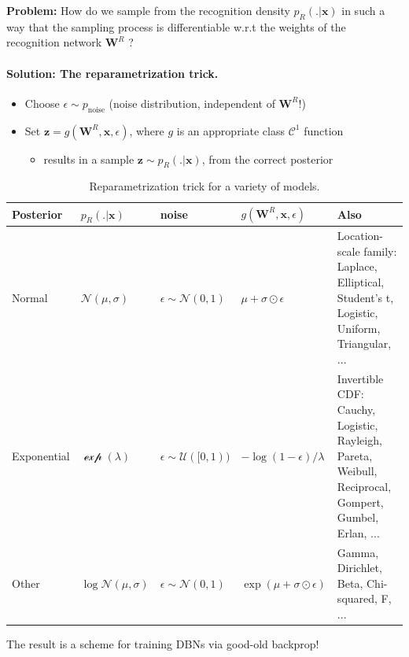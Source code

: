 \documentclass{article} %
\def\z{\mathbf{z}}
\def\W{\mathbf{W}}
\def\x{\mathbf{x}}
\begin{document}
\begin{mdframed}
  \textbf{Problem:} How do we sample from the recognition density $p_R(.|\x)$ in such a way that the sampling process is differentiable w.r.t the weights of the recognition network $\W^R$ ?
\end{mdframed}
\paragraph{Solution: The reparametrization trick.}
\begin{itemize}
\item Choose $\epsilon \sim p_{\text{noise}}$ (noise distribution, independent of $\W^R$!)
\item Set $\z = g(\W^{R}, \x, \epsilon)$, where $g$ is an appropriate class $\mathcal C^1$ function
  \begin{itemize}
  \item results in a sample $\z \sim p_R(.|\x)$, from the correct
    posterior
    \end{itemize}
\end{itemize}

\begin{table}[H]
  \begin{tabular}{p{1.7cm}|p{1.5cm}|p{1.9cm}|p{2.1cm}|p{5cm}}
         \hline
         Posterior & $p_R(.|\x)$ & noise & $g(\W^R,\x,\epsilon)$ & Also \\ \hline
         Normal & $\mathcal N(\mu,\sigma)$ & $\epsilon \sim \mathcal N(0, 1)$ & $\mu + \sigma \odot \epsilon$ & Location-scale family: Laplace, Elliptical,
         Student’s t, Logistic, Uniform, Triangular, ... \\ \hline
         Exponential & $\mathcal \exp(\lambda)$ & $\epsilon \sim \mathcal U([0, 1))$ & $-\log(1-\epsilon)/\lambda$ & Invertible CDF: Cauchy, Logistic, Rayleigh, Pareta, Weibull, Reciprocal, Gompert, Gumbel, Erlan, ... \\ \hline
         Other & $\log\mathcal N(\mu,\sigma)$ & $\epsilon \sim \mathcal N(0, 1)$ & $\exp(\mu + \sigma \odot \epsilon)$ & Gamma, Dirichlet, Beta, Chi-squared, F, ... \\ \hline
  \end{tabular}
  \caption{Reparametrization trick \citep{kingma2013auto} for a variety of models.}
\end{table}

The result is a scheme for training DBNs via good-old backprop!

\end{document}

